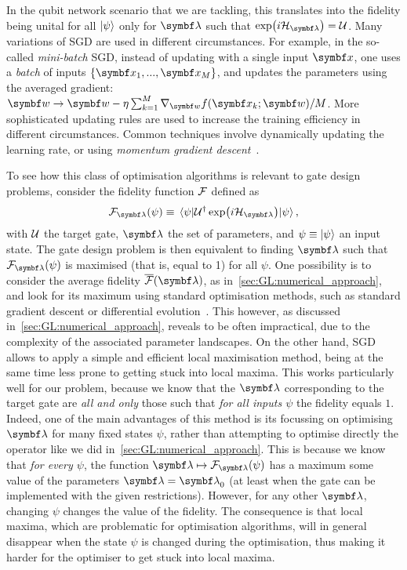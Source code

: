 In the qubit network scenario that we are tackling, this translates into the fidelity being unital for all $\ket\psi$ only for $\bslambda$ such that $\exp(i\calH_\bslambda)=\calU$.
Many variations of \ac{SGD} are used in different circumstances.
For example, in the so-called \emph{mini-batch} \ac{SGD}, instead of updating with a single input $\bs x$, one uses a \emph{batch} of inputs $\{\bs x_1,...,\bs x_M\}$, and updates the parameters using the averaged gradient:
$\bs w\to\bs w-\eta\sum_{k=1}^M\grad_{\bs w}f(\bs x_k; \bs w)/M$.
More sophisticated updating rules are used to increase the training efficiency in different circumstances.
Common techniques involve dynamically updating the learning rate, or using \emph{momentum gradient descent}~\cite{goh2017momentum,ruder2016overview}.

To see how this class of optimisation algorithms is relevant to gate design problems, consider the fidelity function ${\mathcal{F}}$ defined as
\begin{equation}
	\calF_\bslambda(\psi) \equiv \mel{\psi}{\calU^\dagger \exp(i \calH_\bslambda)}{\psi},
	\label{eq:GL:def_fidelity}
\end{equation}
with ${\mathcal{U}}$ the target gate, $\bslambda$ the set of parameters, and $\psi\equiv\ket\psi$ an input state.
The gate design problem is then equivalent to finding $\bslambda$ such that $\calF_\bslambda(\psi)$ is maximised (that is, equal to 1) for all $\psi$.
One possibility is to consider the average fidelity $\barcalF(\bslambda)$, as in~\cref{sec:GL:numerical_approach}, and look for its maximum using standard optimisation methods, such as standard gradient descent or differential evolution~\cite{chakraborty2008advances}.
This however, as discussed in~\cref{sec:GL:numerical_approach}, reveals to be often impractical, due to the complexity of the associated parameter landscapes.
On the other hand, \ac{SGD} allows to apply a simple and efficient local maximisation method, being at the same time less prone to getting stuck into local maxima.
This works particularly well for our problem, because we know that the $\bslambda$ corresponding to the target gate are \emph{all and only} those such that \emph{for all inputs $\psi$} the fidelity equals $1$.
Indeed, one of the main advantages of this method is its focussing on optimising $\bslambda$ for many fixed states $\psi$, rather than attempting to optimise directly the operator like we did in~\cref{sec:GL:numerical_approach}.
This is because we know that \emph{for every $\psi$}, the function $\bslambda\mapsto \calF_\bslambda(\psi)$ has a maximum some value of the parameters $\bslambda=\bslambda_0$ (at least when the gate can be implemented with the given restrictions). However, for any other $\bslambda$, changing $\psi$ changes the value of the fidelity. The consequence is that local maxima, which are problematic for optimisation algorithms, will in general disappear when the state $\psi$ is changed during the optimisation, thus making it harder for the optimiser to get stuck into local maxima.

